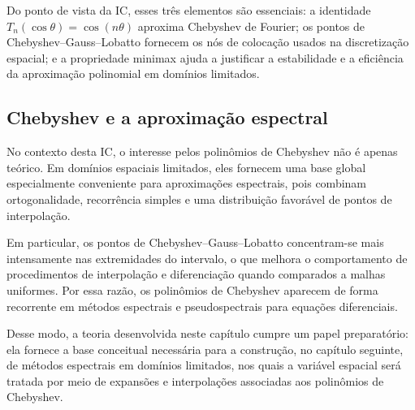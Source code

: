 Do ponto de vista da IC, esses três elementos são essenciais: a identidade \(T_n(\cos\theta)=\cos(n\theta)\) aproxima Chebyshev de Fourier; os pontos de Chebyshev--Gauss--Lobatto fornecem os nós de colocação usados na discretização espacial; e a propriedade minimax ajuda a justificar a estabilidade e a eficiência da aproximação polinomial em domínios limitados.

\subsection{Chebyshev e a aproximação espectral}

No contexto desta IC, o interesse pelos polinômios de Chebyshev não é apenas teórico. Em domínios espaciais limitados, eles fornecem uma base global especialmente conveniente para aproximações espectrais, pois combinam ortogonalidade, recorrência simples e uma distribuição favorável de pontos de interpolação.

Em particular, os pontos de Chebyshev--Gauss--Lobatto concentram-se mais intensamente nas extremidades do intervalo, o que melhora o comportamento de procedimentos de interpolação e diferenciação quando comparados a malhas uniformes. Por essa razão, os polinômios de Chebyshev aparecem de forma recorrente em métodos espectrais e pseudospectrais para equações diferenciais.

Desse modo, a teoria desenvolvida neste capítulo cumpre um papel preparatório: ela fornece a base conceitual necessária para a construção, no capítulo seguinte, de métodos espectrais em domínios limitados, nos quais a variável espacial será tratada por meio de expansões e interpolações associadas aos polinômios de Chebyshev.
